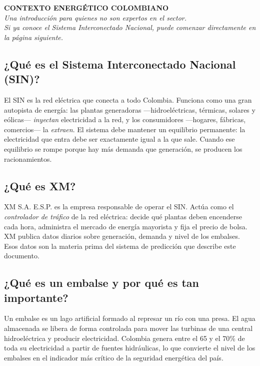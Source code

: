 \documentclass[11pt,a4paper]{article}
\begin{document}
\thispagestyle{empty}

\begin{center}
{\Huge\bfseries\color{titleblue} CONTEXTO ENERGÉTICO COLOMBIANO}\\[5mm]
{\large\color{gray}\itshape
  Una introducción para quienes no son expertos en el sector.\\
  Si ya conoce el Sistema Interconectado Nacional, puede comenzar directamente en la página siguiente.
}
\end{center}

\vspace{6mm}

\subsection*{¿Qué es el Sistema Interconectado Nacional (SIN)?}

El SIN es la red eléctrica que conecta a todo Colombia. Funciona como una gran autopista de energía: las plantas generadoras —hidroeléctricas, térmicas, solares y eólicas— \textit{inyectan} electricidad a la red, y los consumidores —hogares, fábricas, comercios— la \textit{extraen}. El sistema debe mantener un equilibrio permanente: la electricidad que entra debe ser exactamente igual a la que sale. Cuando ese equilibrio se rompe porque hay más demanda que generación, se producen los racionamientos.

\subsection*{¿Qué es XM?}

XM S.A. E.S.P. es la empresa responsable de operar el SIN. Actúa como el \textit{controlador de tráfico} de la red eléctrica: decide qué plantas deben encenderse cada hora, administra el mercado de energía mayorista y fija el precio de bolsa. XM publica datos diarios sobre generación, demanda y nivel de los embalses. Esos datos son la materia prima del sistema de predicción que describe este documento.

\subsection*{¿Qué es un embalse y por qué es tan importante?}

Un embalse es un lago artificial formado al represar un río con una presa. El agua almacenada se libera de forma controlada para mover las turbinas de una central hidroeléctrica y producir electricidad. Colombia genera entre el 65 y el 70\% de toda su electricidad a partir de fuentes hidráulicas, lo que convierte el nivel de los embalses en el indicador más crítico de la seguridad energética del país.
\end{document}
